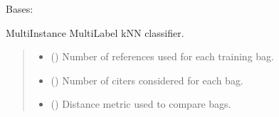\documentclass[letterpaper,10pt,english]{sphinxmanual}
\begin{document}
\begin{fulllineitems}
\label{\detokenize{classifier/lazy/index:miml.classifier.miml.lazy.miml_knn.MIMLkNN}}
\pysigstartsignatures
\pysiglinewithargsret
{}
{\sphinxparamcomma {}\sphinxparamcomma {}}
{}
\pysigstopsignatures
\sphinxAtStartPar
Bases: {\hyperref[\detokenize{classifier/lazy/index:miml.classifier.miml.lazy.multi_instance_multi_label_knn.MultiInstanceMultiLabelKNN}]{}}

\sphinxAtStartPar
Multi\sphinxhyphen{}Instance Multi\sphinxhyphen{}Label kNN classifier.
\begin{quote}\begin{description}
\begin{itemize}
\item {} 
\sphinxAtStartPar
{} (\sphinxstyleliteralemphasis{\sphinxupquote{, }}) \textendash{} Number of references used for each training bag.

\item {} 
\sphinxAtStartPar
{} (\sphinxstyleliteralemphasis{\sphinxupquote{, }}) \textendash{} Number of citers considered for each bag.

\item {} 
\sphinxAtStartPar
{} ({\hyperref[\detokenize{core/index:miml.core.hausdorff_distance.HausdorffDistance}]{}}\sphinxstyleliteralemphasis{\sphinxupquote{, }}) \textendash{} Distance metric used to compare bags.

\end{itemize}

\end{description}\end{quote}


\end{fulllineitems}
\end{document}
